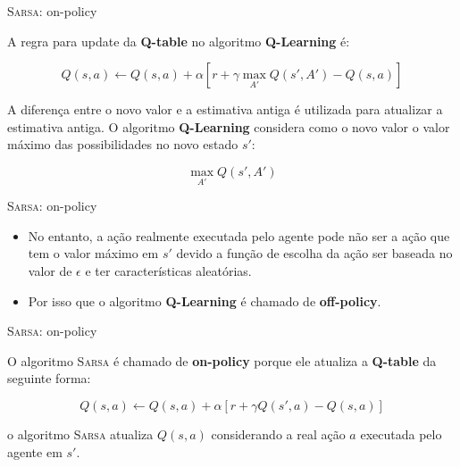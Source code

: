 \documentclass{beamer}
\begin{document}
\begin{frame}{\textsc{Sarsa}: on-policy}
	
	A regra para update da \textbf{Q-table} no algoritmo \textbf{Q-Learning} é: 
	
	\begin{equation}
	Q(s,a) \leftarrow Q(s,a) + \alpha [r +\gamma \max_{A'}{Q(s', A')} - Q(s,a)]
	\end{equation}

	A diferença entre o novo valor e a estimativa antiga é utilizada para atualizar a estimativa antiga. O algoritmo \textbf{Q-Learning} considera como o novo valor o valor máximo das possibilidades no novo estado $s'$: 
	
	\begin{equation}
	\max_{A'}{Q(s', A')}
	\end{equation}
	
\end{frame}


\begin{frame}{\textsc{Sarsa}: on-policy}
	
	\begin{itemize}
		
	\item No entanto, a ação realmente executada pelo agente pode não ser a ação que tem o valor máximo em $s'$ devido a função de escolha da ação ser baseada no valor de $\epsilon$ e ter características aleatórias.
	
	\item Por isso que o algoritmo \textbf{Q-Learning} é chamado de \textbf{off-policy}.   
\end{itemize}
	
\end{frame}


\begin{frame}{\textsc{Sarsa}: on-policy}
	
	O algoritmo \textsc{Sarsa} é chamado de  \textbf{on-policy} porque ele atualiza a \textbf{Q-table} da seguinte forma: 
	
	\begin{equation}
		Q(s,a) \leftarrow Q(s,a) + \alpha [r +\gamma Q(s', a) - Q(s,a)]
	\end{equation}
	
	o algoritmo \textsc{Sarsa} atualiza $Q(s,a)$ considerando a real ação $a$ executada pelo agente em $s'$.
	
\end{frame}

\def\HiLi{\leavevmode\rlap{\hbox to \hsize{\color{yellow!50}\leaders\hrule height .8\baselineskip depth .5ex\hfill}}}
\end{document}
